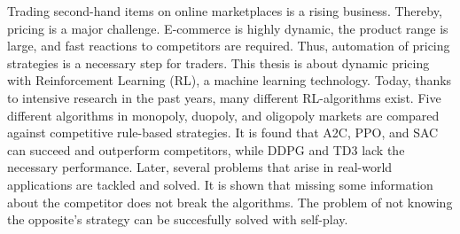 Trading second-hand items on online marketplaces is a rising business.
Thereby, pricing is a major challenge.
E-commerce is highly dynamic, the product range is large, and fast reactions to competitors are required.
Thus, automation of pricing strategies is a necessary step for traders.
This thesis is about dynamic pricing with Reinforcement Learning (RL), a machine learning technology.
Today, thanks to intensive research in the past years, many different RL-algorithms exist.
Five different algorithms in monopoly, duopoly, and oligopoly markets are compared against competitive rule-based strategies.
It is found that A2C, PPO, and SAC can succeed and outperform competitors, while DDPG and TD3 lack the necessary performance.
Later, several problems that arise in real-world applications are tackled and solved.
It is shown that missing some information about the competitor does not break the algorithms.
The problem of not knowing the opposite's strategy can be succesfully solved with self-play.
